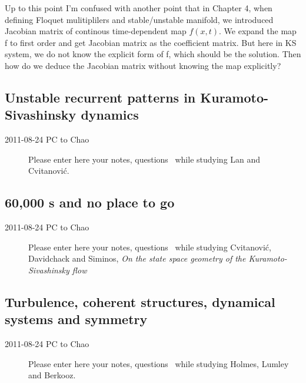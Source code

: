 \begin{description}
Up to this point I'm confused with another point that in Chapter 4, when defining Floquet mulitiplilers and stable/unstable manifold, we introduced Jacobian matrix of continous time-dependent map $f(x,t)$. We expand the map f to first order and get Jacobian matrix as the coefficient matrix. But here in KS system, we do not know the explicit form of f, which should be the solution. Then how do we deduce the Jacobian matrix without knowing the map explicitly?

\end{description}

\subsection{Unstable recurrent patterns in {Kuramoto-Sivashinsky} dynamics}
\label{s:lanCvit07}

\begin{description}

\item[2011-08-24 PC to Chao]
Please enter here your notes, questions \etc\ while studying
Lan and Cvitanovi{\'c}.

\end{description}



\subsection{60,000 \rpo s and no place to go}
\label{s:SCD07}

\begin{description}

\item[2011-08-24 PC to Chao]
Please enter here your notes, questions \etc\ while studying
Cvitanovi{\'c}, Davidchack and Siminos,
\emph{On the state space geometry of the {Kuramoto-Sivashinsky} flow}

\end{description}

\subsection{Turbulence, coherent structures, dynamical systems and
symmetry}
\label{s:Holmes96}

\begin{description}

\item[2011-08-24 PC to Chao]
Please enter here your notes, questions \etc\ while studying
Holmes, Lumley and Berkooz.

\end{description}

